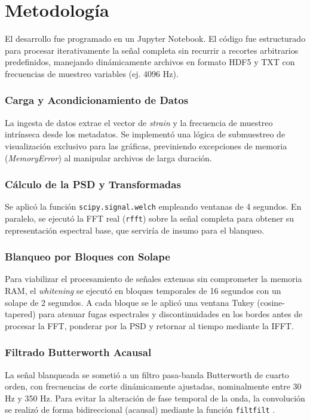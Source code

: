 \documentclass[conference]{IEEEtran}
\begin{document}
	\section{Metodología}
	El desarrollo fue programado en un Jupyter Notebook. El código fue estructurado para procesar iterativamente la señal completa sin recurrir a recortes arbitrarios predefinidos, manejando dinámicamente archivos en formato HDF5 y TXT con frecuencias de muestreo variables (ej. 4096 Hz).
	
	\subsubsection{Carga y Acondicionamiento de Datos}
	La ingesta de datos extrae el vector de \textit{strain} y la frecuencia de muestreo intrínseca desde los metadatos. Se implementó una lógica de submuestreo de visualización exclusivo para las gráficas, previniendo excepciones de memoria (\textit{MemoryError}) al manipular archivos de larga duración.
	
	\subsubsection{Cálculo de la PSD y Transformadas}
	Se aplicó la función \texttt{scipy.signal.welch} empleando ventanas de 4 segundos. En paralelo, se ejecutó la FFT real (\texttt{rfft}) sobre la señal completa para obtener su representación espectral base, que serviría de insumo para el blanqueo.
	
	\subsubsection{Blanqueo por Bloques con Solape}
	Para viabilizar el procesamiento de señales extensas sin comprometer la memoria RAM, el \textit{whitening} se ejecutó en bloques temporales de 16 segundos con un solape de 2 segundos. A cada bloque se le aplicó una ventana Tukey (cosine-tapered) para atenuar fugas espectrales y discontinuidades en los bordes antes de procesar la FFT, ponderar por la PSD y retornar al tiempo mediante la IFFT.
	
	\subsubsection{Filtrado Butterworth Acausal}
	La señal blanqueada se sometió a un filtro pasa-banda Butterworth de cuarto orden, con frecuencias de corte dinámicamente ajustadas, nominalmente entre 30 Hz y 350 Hz. Para evitar la alteración de fase temporal de la onda, la convolución se realizó de forma bidireccional (acausal) mediante la función \texttt{filtfilt} \cite{berry2020}.
	
\end{document}
